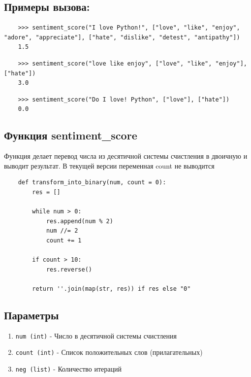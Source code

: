 \documentclass{article}
\begin{document}
    
    \subsection*{Примеры вызова:}
        \begin{verbatim}
    >>> sentiment_score("I love Python!", ["love", "like", "enjoy", "adore", "appreciate"], ["hate", "dislike", "detest", "antipathy"]) 
    1.5
        \end{verbatim}

        \begin{verbatim}
    >>> sentiment_score("love like enjoy", ["love", "like", "enjoy"], ["hate"]) 
    3.0
        \end{verbatim}

        \begin{verbatim}
    >>> sentiment_score("Do I love! Python", ["love"], ["hate"]) 
    0.0
        \end{verbatim}



    \hrulefill

    \subsection{Функция sentiment\_score}
    
    Функция делает перевод числа из десятичной системы счистления в двоичную и выводит результат. В текущей версии переменная count не выводится 

    
    \begin{verbatim}
    def transform_into_binary(num, count = 0):  
        res = [] 
        
        while num > 0: 
            res.append(num % 2) 
            num //= 2 
            count += 1 
            
        if count > 10: 
            res.reverse() 
            
        return ''.join(map(str, res)) if res else "0" 
    \end{verbatim}
    
    \subsection*{Параметры}
        \begin{enumerate}
            \item \texttt{num (int)} - Число в десятичной системы счистления 
            \item \texttt{count (int)} - Список положительных слов (прилагательных)
            \item \texttt{neg (list)} -  Количество итераций
        \end{enumerate}
        
\end{document}
